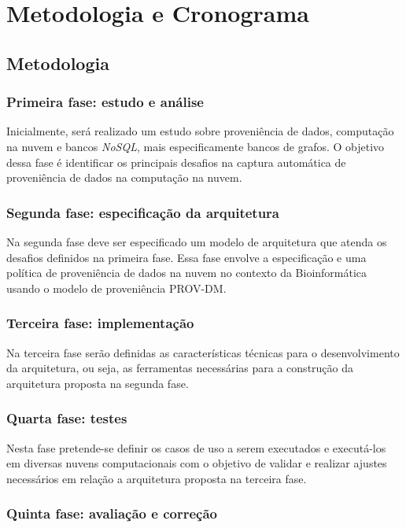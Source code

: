 \chapter{Metodologia e Cronograma}

\section{Metodologia}

\subsection{Primeira fase: estudo e análise}

Inicialmente, será realizado um estudo sobre proveniência de dados,
computação na nuvem e bancos \textit{NoSQL}, mais especificamente bancos de grafos. O objetivo dessa fase é identificar os principais desafios na captura automática de proveniência de dados na computação na nuvem.

\subsection{Segunda fase: especificação da arquitetura}

Na segunda fase deve ser especificado um modelo de arquitetura que atenda
os desafios definidos na primeira fase. Essa fase envolve a
especificação e uma política de proveniência de dados na nuvem no contexto da Bioinformática usando o modelo de proveniência PROV-DM.


\subsection{Terceira fase: implementação}

Na terceira fase serão definidas as características técnicas para o
desenvolvimento da arquitetura, ou seja, as ferramentas necessárias para a construção da arquitetura proposta na segunda fase.

\subsection{Quarta fase: testes}

Nesta fase pretende-se definir os casos de uso a serem executados e
executá-los em diversas nuvens computacionais com o objetivo de
validar e realizar ajustes necessários em relação a arquitetura
proposta na terceira fase.

\subsection{Quinta fase: avaliação e correção}

